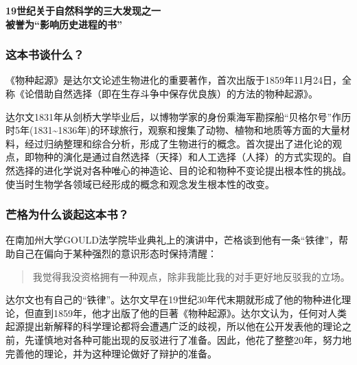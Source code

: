 \cleardoublepage
{}


\begin{BookSummaryBox}
{\centering \textbf{19世纪关于自然科学的三大发现之一\\ 被誉为“影响历史进程的书”}\par}
\end{BookSummaryBox}

\subsubsection*{这本书谈什么？}

《物种起源》是达尔文论述生物进化的重要著作，首次出版于1859年11月24日，全称《论借助自然选择（即在生存斗争中保存优良族）的方法的物种起源》。
\par

达尔文1831年从剑桥大学毕业后，以博物学家的身份乘海军勘探船“贝格尔号”作历时5年(1831\textasciitilde{}1836年)的环球旅行，观察和搜集了动物、植物和地质等方面的大量材料，经过归纳整理和综合分析，形成了生物进行的概念。首次提出了进化论的观点，即物种的演化是通过自然选择（天择）和人工选择（人择）的方式实现的。自然选择的进化学说对各种唯心的神造论、目的论和物种不变论提出根本性的挑战。使当时生物学各领域已经形成的概念和观念发生根本性的改变。
\par

\subsubsection*{芒格为什么谈起这本书？}

在南加州大学GOULD法学院毕业典礼上的演讲中，芒格谈到他有一条“铁律”，帮助自己在偏向于某种强烈的意识形态时保持清醒：
\par

\begin{quotation}
我觉得我没资格拥有一种观点，除非我能比我的对手更好地反驳我的立场。
\par
\end{quotation}

达尔文也有自己的“铁律”。达尔文早在19世纪30年代末期就形成了他的物种进化理论，但直到1859年，他才出版了他的巨著《物种起源》。达尔文认为，任何对人类起源提出新解释的科学理论都将会遭遇广泛的歧视，所以他在公开发表他的理论之前，先谨慎地对各种可能出现的反驳进行了准备。因此，他花了整整20年，努力地完善他的理论，并为这种理论做好了辩护的准备。
\par

